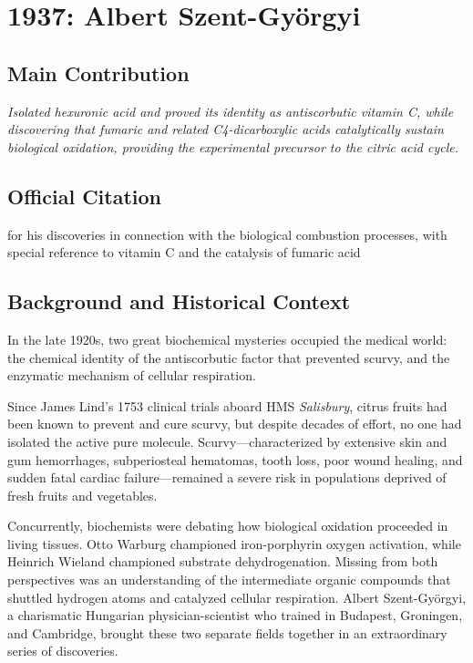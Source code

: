 \chapter[1937 --- Szent-Gyorgyi]{1937: Albert Szent-Gy\"orgyi}
\label{ch:1937_albertszentgyorgyi}

\section*{Main Contribution}

\textit{Isolated hexuronic acid and proved its identity as antiscorbutic vitamin C, while discovering that fumaric and related C4-dicarboxylic acids catalytically sustain biological oxidation, providing the experimental precursor to the citric acid cycle.}\cite{nobel-1937,lecture-1937,vitamin-c-history,fumaric-acid-history}

\section{Official Citation}

for his discoveries in connection with the biological combustion processes, with special reference to vitamin C and the catalysis of fumaric acid

\section{Background and Historical Context}

In the late 1920s, two great biochemical mysteries occupied the medical world: the chemical identity of the antiscorbutic factor that prevented scurvy, and the enzymatic mechanism of cellular respiration. 

Since James Lind's 1753 clinical trials aboard HMS \emph{Salisbury}, citrus fruits had been known to prevent and cure scurvy, but despite decades of effort, no one had isolated the active pure molecule. Scurvy—characterized by extensive skin and gum hemorrhages, subperiosteal hematomas, tooth loss, poor wound healing, and sudden fatal cardiac failure—remained a severe risk in populations deprived of fresh fruits and vegetables.

Concurrently, biochemists were debating how biological oxidation proceeded in living tissues. Otto Warburg championed iron-porphyrin oxygen activation, while Heinrich Wieland championed substrate dehydrogenation. Missing from both perspectives was an understanding of the intermediate organic compounds that shuttled hydrogen atoms and catalyzed cellular respiration. Albert Szent-Györgyi, a charismatic Hungarian physician-scientist who trained in Budapest, Groningen, and Cambridge, brought these two separate fields together in an extraordinary series of discoveries.

